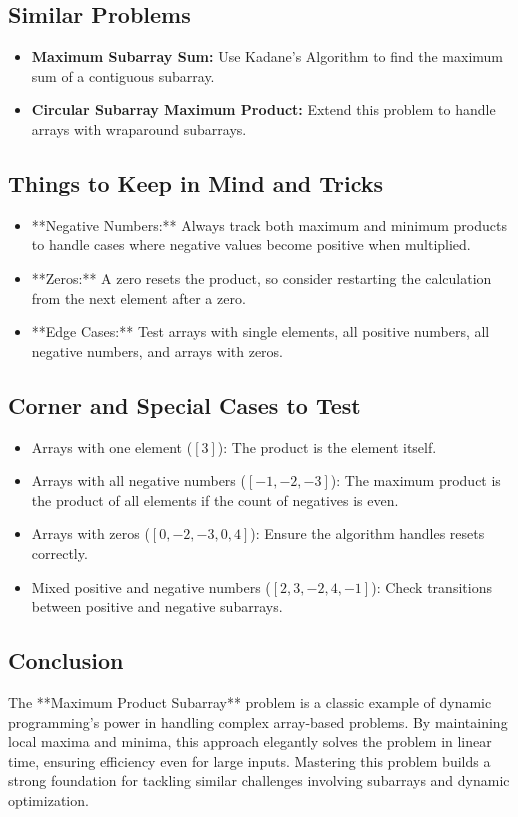 \subsection*{Similar Problems}
\begin{itemize}
    \item \textbf{Maximum Subarray Sum:} Use Kadane’s Algorithm to find the maximum sum of a contiguous subarray.
    \item \textbf{Circular Subarray Maximum Product:} Extend this problem to handle arrays with wraparound subarrays.
\end{itemize}

\subsection*{Things to Keep in Mind and Tricks}
\begin{itemize}
    \item **Negative Numbers:** Always track both maximum and minimum products to handle cases where negative values become positive when multiplied.
    \item **Zeros:** A zero resets the product, so consider restarting the calculation from the next element after a zero.
    \item **Edge Cases:** Test arrays with single elements, all positive numbers, all negative numbers, and arrays with zeros.
\end{itemize}

\subsection*{Corner and Special Cases to Test}
\begin{itemize}
    \item Arrays with one element (\([3]\)): The product is the element itself.
    \item Arrays with all negative numbers (\([-1, -2, -3]\)): The maximum product is the product of all elements if the count of negatives is even.
    \item Arrays with zeros (\([0, -2, -3, 0, 4]\)): Ensure the algorithm handles resets correctly.
    \item Mixed positive and negative numbers (\([2, 3, -2, 4, -1]\)): Check transitions between positive and negative subarrays.
\end{itemize}

\subsection*{Conclusion}
The **Maximum Product Subarray** problem is a classic example of dynamic programming’s power in handling complex array-based problems. By maintaining local maxima and minima, this approach elegantly solves the problem in linear time, ensuring efficiency even for large inputs. Mastering this problem builds a strong foundation for tackling similar challenges involving subarrays and dynamic optimization.
